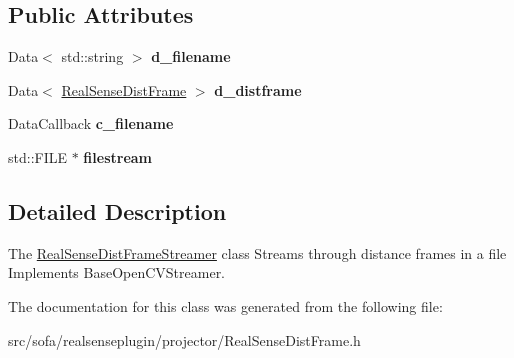 \subsection*{Public Attributes}
\begin{DoxyCompactItemize}
\item 
\mbox{\label{classsofa_1_1rgbdtracking_1_1_real_sense_dist_frame_streamer_a66a7c3a880c2114197e3c476c5bbfbed}} 
Data$<$ std\+::string $>$ {\bfseries d\+\_\+filename}
\item 
\mbox{\label{classsofa_1_1rgbdtracking_1_1_real_sense_dist_frame_streamer_acab30219890af914a1a0d200a9af16a5}} 
Data$<$ \hyperlink{classsofa_1_1rgbdtracking_1_1_real_sense_dist_frame}{Real\+Sense\+Dist\+Frame} $>$ {\bfseries d\+\_\+distframe}
\item 
\mbox{\label{classsofa_1_1rgbdtracking_1_1_real_sense_dist_frame_streamer_ad5d699dd44589bb16c5560fb1bdbb661}} 
Data\+Callback {\bfseries c\+\_\+filename}
\item 
\mbox{\label{classsofa_1_1rgbdtracking_1_1_real_sense_dist_frame_streamer_a6a62882f02e60b44fc462dd7bdd893ea}} 
std\+::\+F\+I\+LE $\ast$ {\bfseries filestream}
\end{DoxyCompactItemize}


\subsection{Detailed Description}
The \hyperlink{classsofa_1_1rgbdtracking_1_1_real_sense_dist_frame_streamer}{Real\+Sense\+Dist\+Frame\+Streamer} class Streams through distance frames in a file Implements Base\+Open\+C\+V\+Streamer. 

The documentation for this class was generated from the following file\+:\begin{DoxyCompactItemize}
\item 
src/sofa/realsenseplugin/projector/Real\+Sense\+Dist\+Frame.\+h\end{DoxyCompactItemize}
